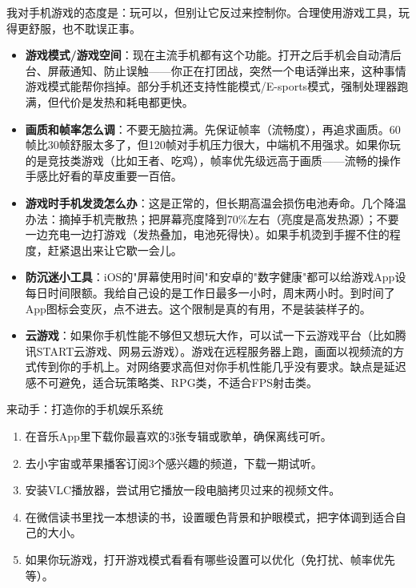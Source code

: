 
我对手机游戏的态度是：玩可以，但别让它反过来控制你。合理使用游戏工具，玩得更舒服，也不耽误正事。

\begin{itemize}
  \item \textbf{游戏模式/游戏空间}：现在主流手机都有这个功能。打开之后手机会自动清后台、屏蔽通知、防止误触——你正在打团战，突然一个电话弹出来，这种事情游戏模式能帮你挡掉。部分手机还支持性能模式/E-sports模式，强制处理器跑满，但代价是发热和耗电都更快。
  \item \textbf{画质和帧率怎么调}：不要无脑拉满。先保证帧率（流畅度），再追求画质。60帧比30帧舒服太多了，但120帧对手机压力很大，中端机不用强求。如果你玩的是竞技类游戏（比如王者、吃鸡），帧率优先级远高于画质——流畅的操作手感比好看的草皮重要一百倍。
  \item \textbf{游戏时手机发烫怎么办}：这是正常的，但长期高温会损伤电池寿命。几个降温办法：摘掉手机壳散热；把屏幕亮度降到70\%左右（亮度是高发热源）；不要一边充电一边打游戏（发热叠加，电池死得快）。如果手机烫到手握不住的程度，赶紧退出来让它歇一会儿。
  \item \textbf{防沉迷小工具}：iOS的"屏幕使用时间"和安卓的"数字健康"都可以给游戏App设每日时间限额。我给自己设的是工作日最多一小时，周末两小时。到时间了App图标会变灰，点不进去。这个限制是真的有用，不是装装样子的。
  \item \textbf{云游戏}：如果你手机性能不够但又想玩大作，可以试一下云游戏平台（比如腾讯START云游戏、网易云游戏）。游戏在远程服务器上跑，画面以视频流的方式传到你的手机上。对网络要求高但对你手机性能几乎没有要求。缺点是延迟感不可避免，适合玩策略类、RPG类，不适合FPS射击类。
\end{itemize}

\begin{tcbpractice}{来动手：打造你的手机娱乐系统}
\begin{enumerate}
  \item 在音乐App里下载你最喜欢的3张专辑或歌单，确保离线可听。
  \item 去小宇宙或苹果播客订阅3个感兴趣的频道，下载一期试听。
  \item 安装VLC播放器，尝试用它播放一段电脑拷贝过来的视频文件。
  \item 在微信读书里找一本想读的书，设置暖色背景和护眼模式，把字体调到适合自己的大小。
  \item 如果你玩游戏，打开游戏模式看看有哪些设置可以优化（免打扰、帧率优先等）。
\end{enumerate}

\end{tcbpractice}
